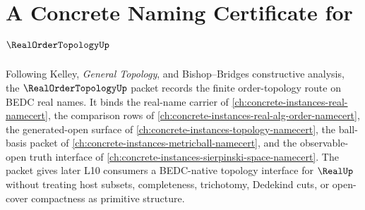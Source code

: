 \chapter{A Concrete Naming Certificate for $\RealOrderTopologyUp$}
\label{ch:concrete-instances-real-order-topology-namecert}

Following Kelley, \emph{General Topology}, and Bishop--Bridges constructive analysis, the $\RealOrderTopologyUp$ packet records the finite order-topology route on BEDC real names. It binds the real-name carrier of \autoref{ch:concrete-instances-real-namecert}, the comparison rows of \autoref{ch:concrete-instances-real-alg-order-namecert}, the generated-open surface of \autoref{ch:concrete-instances-topology-namecert}, the ball-basis packet of \autoref{ch:concrete-instances-metricball-namecert}, and the observable-open truth interface of \autoref{ch:concrete-instances-sierpinski-space-namecert}. The packet gives later L10 consumers a BEDC-native topology interface for $\RealUp$ without treating host subsets, completeness, trichotomy, Dedekind cuts, or open-cover compactness as primitive structure.

